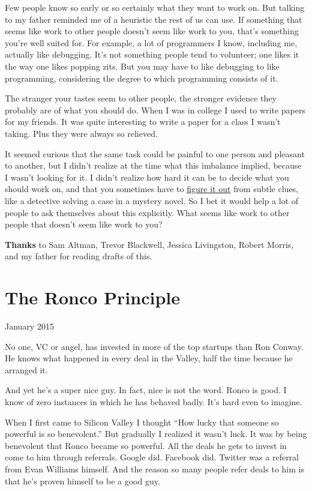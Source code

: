 \documentclass[12pt]{book}
\begin{document}
Few people know so early or so certainly what they want to work on. But
talking to my father reminded me of a heuristic the rest of us can use.
If something that seems like work to other people doesn't seem like work
to you, that's something you're well suited for. For example, a lot of
programmers I know, including me, actually like debugging. It's not
something people tend to volunteer; one likes it the way one likes
popping zits. But you may have to like debugging to like programming,
considering the degree to which programming consists of it.

The stranger your tastes seem to other people, the stronger evidence
they probably are of what you should do. When I was in college I used to
write papers for my friends. It was quite interesting to write a paper
for a class I wasn't taking. Plus they were always so relieved.

It seemed curious that the same task could be painful to one person and
pleasant to another, but I didn't realize at the time what this
imbalance implied, because I wasn't looking for it. I didn't realize how
hard it can be to decide what you should work on, and that you sometimes
have to \href{love.html}{figure it out} from subtle clues, like a
detective solving a case in a mystery novel. So I bet it would help a
lot of people to ask themselves about this explicitly. What seems like
work to other people that doesn't seem like work to you?

\textbf{Thanks} to Sam Altman, Trevor Blackwell, Jessica Livingston,
Robert Morris, and my father for reading drafts of this.
\chapter{The Ronco Principle}

January 2015

No one, VC or angel, has invested in more of the top startups than Ron
Conway. He knows what happened in every deal in the Valley, half the
time because he arranged it.

And yet he's a super nice guy. In fact, nice is not the word. Ronco is
good. I know of zero instances in which he has behaved badly. It's hard
even to imagine.

When I first came to Silicon Valley I thought ``How lucky that someone
so powerful is so benevolent.'' But gradually I realized it wasn't luck.
It was by being benevolent that Ronco became so powerful. All the deals
he gets to invest in come to him through referrals. Google did. Facebook
did. Twitter was a referral from Evan Williams himself. And the reason
so many people refer deals to him is that he's proven himself to be a
good guy.
\end{document}
